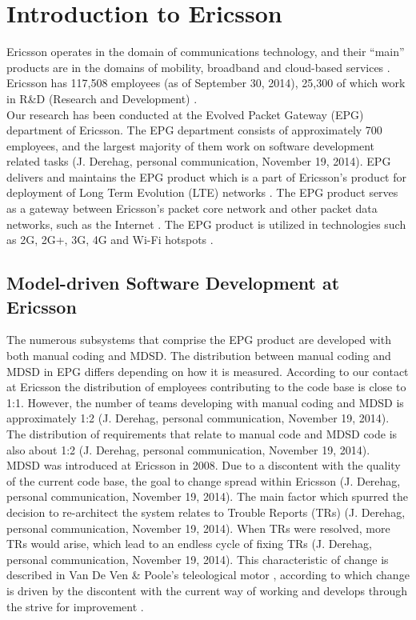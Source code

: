 \documentclass[final_report_innit.tex]{subfiles}
\begin{document}
\section{Introduction to Ericsson}
Ericsson operates in the domain of communications technology, and their “main” products are in the domains of mobility, broadband and cloud-based services \cite{etc} \cite{ecf}. Ericsson has 117,508 employees (as of September 30, 2014), 25,300 of which work in R\&D (Research and Development) \cite{etc}.
\\

Our research has been conducted at the Evolved Packet Gateway (EPG) department of Ericsson. The EPG department consists of approximately 700 employees, and the largest majority of them work on software development related tasks (J. Derehag, personal communication, November 19, 2014). EPG delivers and maintains the EPG product which is a part of Ericsson’s product for deployment of Long Term Evolution (LTE) networks \cite{eepg}. The EPG product serves as a gateway between Ericsson’s packet core network and other packet data networks, such as the Internet \cite{eepg}. The EPG product is utilized in technologies such as 2G, 2G+, 3G, 4G and Wi-Fi hotspots \cite{eepg}.

\subsection{Model-driven Software Development at Ericsson}
The numerous subsystems that comprise the EPG product are developed with both manual coding and MDSD. The distribution between manual coding and MDSD in EPG differs depending on how it is measured. According to our contact at Ericsson the distribution of employees contributing to the code base is close to 1:1. However, the number of teams developing with manual coding and MDSD is approximately 1:2 (J. Derehag, personal communication, November 19, 2014). The distribution of requirements that relate to manual code and MDSD code is also about 1:2 (J. Derehag, personal communication, November 19, 2014).
\\

MDSD was introduced at Ericsson in 2008. Due to a discontent with the quality of the current code base, the goal to change spread within Ericsson (J. Derehag, personal communication, November 19, 2014). The main factor which spurred the decision to re-architect the system relates to Trouble Reports (TRs) (J. Derehag, personal communication, November 19, 2014). When TRs were resolved, more TRs would arise, which lead to an endless cycle of fixing TRs (J. Derehag, personal communication, November 19, 2014). This characteristic of change is described in Van De Ven \& Poole’s teleological motor \cite{van1995explaining}, according to which change is driven by the discontent with the current way of working and develops through the strive for improvement \cite{van1995explaining}. 
\\
\end{document}
